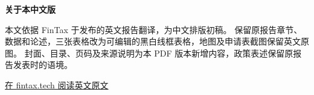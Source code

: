 \documentclass[UTF8,11pt,a4paper,fontset=fandol,scheme=plain]{ctexart}
\begin{document}
\hypersetup{pageanchor=false}

\hypersetup{pageanchor=true}
\tableofcontents
\vfill
\noindent\textbf{关于本中文版}\par
\noindent 本文依据 FinTax 于\ReportDate{}发布的英文报告翻译，为中文排版初稿。
保留原报告章节、数据和论述，三张表格改为可编辑的黑白线框表格，地图及申请表截图保留英文原图。
封面、目录、页码及来源说明为本 PDF 版本新增内容，政策表述保留原报告发表时的语境。\par
\medskip
\noindent\href{\ReportURL}{在 fintax.tech 阅读英文原文}
\clearpage
{}






% 
% 
\end{document}

